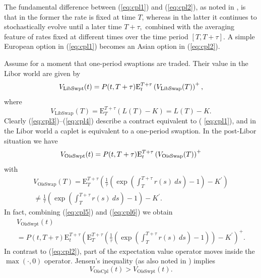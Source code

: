 \documentclass{article}
\begin{document}
The fundamental difference between (\ref{eq:cpl1}) and (\ref{eq:cpl2}), as
noted in \cite{henrard-ssrn1}, is that in the former the rate is fixed at
time $T$, whereas in the latter it continues to stochastically evolve until
a later time $T+\tau ,$ combined with the averaging feature of rates fixed
at different times over the time period $[T,T+\tau ].$ A simple European
option in (\ref{eq:cpl1}) becomes an Asian option in (\ref{eq:cpl2}).

Assume for a moment that one-period swaptions are traded. Their value in the
Libor world are given by%
\begin{equation}
V_{\mathrm{LibSwpt}}(t)=P(t,T+\tau )\mathrm{E}_{t}^{T+\tau }\left( V_{%
\mathrm{LibSwap}}(T)\right) ^{+},  \label{eq:cpl3}
\end{equation}%
where%
\begin{equation}
V_{\mathrm{LibSwap}}(T)=\mathrm{E}_{T}^{T+\tau }\left( L(T)-K\right) =L(T)-K.
\label{eq:cpl4}
\end{equation}%
Clearly (\ref{eq:cpl3})--(\ref{eq:cpl4}) describe a contract equivalent to (%
\ref{eq:cpl1}), and in the Libor world a caplet is equivalent to a
one-period swaption. In the post-Libor situation we have%
\begin{equation}
V_{\mathrm{OisSwpt}}(t)=P(t,T+\tau )\mathrm{E}_{t}^{T+\tau }\left( V_{%
\mathrm{OisSwap}}(T)\right) ^{+}  \label{eq:cpl5}
\end{equation}%
with%
\begin{multline}
V_{\mathrm{OisSwap}}(T)=\mathrm{E}_{T}^{T+\tau }\left( \frac{1}{\tau }\left(
\exp \left( \int_{T}^{T+\tau }r(s)~ds\right) -1\right) -K^{\prime }\right) 
\label{eq:cpl6} \\
\neq \frac{1}{\tau }\left( \exp \left( \int_{T}^{T+\tau }r(s)~ds\right)
-1\right) -K^{\prime }.
\end{multline}%
In fact, combining (\ref{eq:cpl5}) and (\ref{eq:cpl6}) we obtain%
\begin{multline}
V_{\mathrm{OisSwpt}}(t)  \label{eq:cpl7} \\
=P(t,T+\tau )\mathrm{E}_{t}^{T+\tau }\left( \mathrm{E}_{T}^{T+\tau }\left( 
\frac{1}{\tau }\left( \exp \left( \int_{T}^{T+\tau }r(s)~ds\right) -1\right)
\right) -K^{\prime }\right) ^{+}.
\end{multline}%
In contrast to (\ref{eq:cpl2}), part of the expectation value operator moves
inside the $\max (\cdot ,0)$ operator. Jensen's inequality (as also noted in 
\cite{lyas-merc-l}) implies%
\begin{equation}
V_{\mathrm{OisCpl}}(t)>V_{\mathrm{OisSwpt}}(t).  \label{eq:cpl8}
\end{equation}
\end{document}
